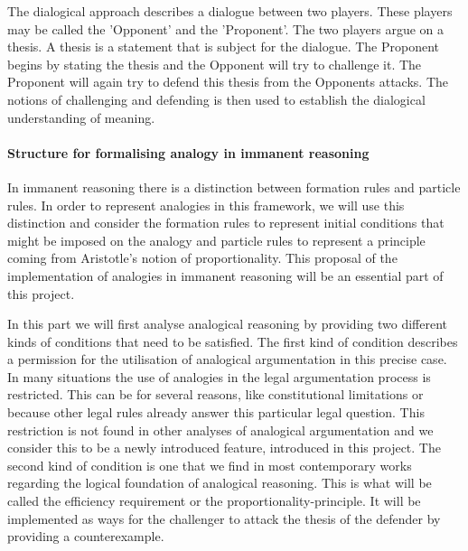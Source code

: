         	The dialogical approach describes a dialogue between two players. These players may be called the 'Opponent' and the 'Proponent'. The two players argue on a thesis. A thesis is a statement that is subject for the dialogue. The Proponent begins by stating the thesis and the Opponent will try to challenge it. The Proponent will again try to defend this thesis from the Opponents attacks. The notions of challenging and defending is then used to establish the dialogical understanding of meaning.

    	\paragraph{Structure for formalising analogy in immanent reasoning}   
    
    		In immanent reasoning there is a distinction between formation rules and particle rules. In order to represent analogies in this framework, we will use this distinction and consider the formation rules to represent initial conditions that might be imposed on the analogy and particle rules to represent a principle coming from Aristotle's notion of proportionality. This proposal of the implementation of analogies in immanent reasoning will be an essential part of this project. 
    		
    		In this part we will first analyse analogical reasoning by providing two different kinds of conditions that need to be satisfied. The first kind of condition describes a permission for the utilisation of analogical argumentation in this precise case. In many situations the use of analogies in the legal argumentation process is restricted. This can be for several reasons, like constitutional limitations or because other legal rules already answer this particular legal question. This restriction is not found in other analyses of analogical argumentation and we consider this to be a newly introduced feature, introduced in this project. The second kind of condition is one that we find in most contemporary works regarding the logical foundation of analogical reasoning. This is what will be called the efficiency requirement or the proportionality-principle. It will be implemented as ways for the challenger to attack the thesis of the defender by providing a counterexample.
    		
